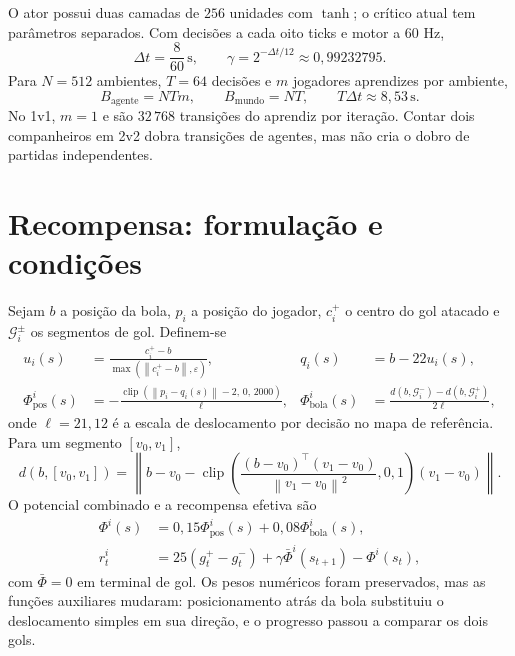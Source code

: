 \documentclass[11pt,a4paper]{article}
\newcommand{\norm}[1]{\left\lVert#1\right\rVert}
\begin{document}
O ator possui duas camadas de $256$ unidades com $\tanh$; o crítico atual tem parâmetros separados. Com decisões a cada oito ticks e motor a $60$ Hz,
\begin{equation}
 \Delta t=\frac{8}{60}\,\mathrm{s},\qquad
 \gamma=2^{-\Delta t/12}\approx0{,}99232795.
\end{equation}
Para $N=512$ ambientes, $T=64$ decisões e $m$ jogadores aprendizes por ambiente,
\begin{equation}
 B_{\mathrm{agente}}=NTm,\qquad B_{\mathrm{mundo}}=NT,
 \qquad T\Delta t\approx8{,}53\,\mathrm{s}.
 \label{eq:budget}
\end{equation}
No 1v1, $m=1$ e são $32\,768$ transições do aprendiz por iteração. Contar dois companheiros em 2v2 dobra transições de agentes, mas não cria o dobro de partidas independentes.

\section{Recompensa: formulação e condições}
Sejam $b$ a posição da bola, $p_i$ a posição do jogador, $c_i^+$ o centro do gol atacado e $\mathcal G_i^\pm$ os segmentos de gol. Definem-se
\begin{align}
 u_i(s)&=\frac{c_i^+-b}{\max(\norm{c_i^+-b},\varepsilon)},&
 q_i(s)&=b-22u_i(s),\\
 \Phi_{\mathrm{pos}}^i(s)&=-\frac{\operatorname{clip}(\norm{p_i-q_i(s)}-2,\,0,\,2000)}{\ell},&
 \Phi_{\mathrm{bola}}^i(s)&=\frac{d(b,\mathcal G_i^-)-d(b,\mathcal G_i^+)}{2\ell},
\end{align}
onde $\ell=21{,}12$ é a escala de deslocamento por decisão no mapa de referência. Para um segmento $[v_0,v_1]$,
\begin{equation}
 d(b,[v_0,v_1])=\norm{b-v_0-\operatorname{clip}\!\left(
 \frac{(b-v_0)^\top(v_1-v_0)}{\norm{v_1-v_0}^2},0,1\right)(v_1-v_0)}.
\end{equation}
O potencial combinado e a recompensa efetiva são
\begin{align}
 \Phi^i(s)&=0{,}15\Phi_{\mathrm{pos}}^i(s)+0{,}08\Phi_{\mathrm{bola}}^i(s),\\
 r_t^i&=25(g_t^+-g_t^-)+\gamma\bar\Phi^i(s_{t+1})-\Phi^i(s_t),
 \label{eq:shaping}
\end{align}
com $\bar\Phi=0$ em terminal de gol. Os pesos numéricos foram preservados, mas as funções auxiliares mudaram: posicionamento atrás da bola substituiu o deslocamento simples em sua direção, e o progresso passou a comparar os dois gols.
\end{document}
